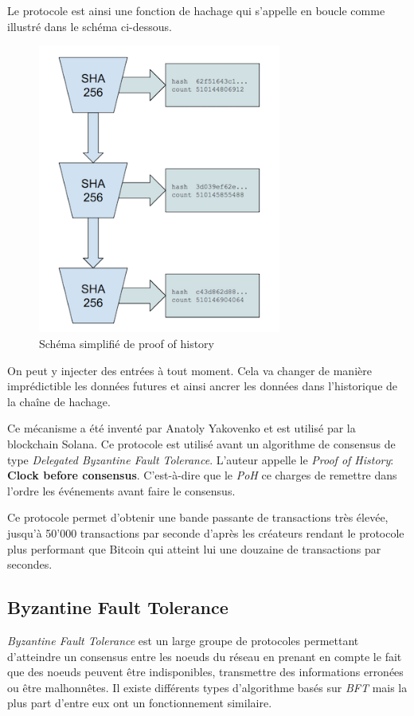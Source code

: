 Le protocole est ainsi une fonction de hachage qui s'appelle en boucle comme illustré dans le schéma ci-dessous.

\begin{figure}[H]
    \centering
    \includegraphics[width=8cm]{images/solana}
    \caption{Schéma simplifié de proof of history}
\end{figure}

On peut y injecter des entrées à tout moment. Cela va changer de manière imprédictible les données futures et ainsi ancrer les données dans l'historique de la chaîne de hachage.

Ce mécanisme a été inventé par Anatoly Yakovenko et est utilisé par la blockchain Solana. Ce protocole est utilisé avant un algorithme de consensus de type \emph{Delegated Byzantine Fault Tolerance}. L'auteur appelle le \emph{Proof of History}: \textbf{Clock before consensus}. C'est-à-dire que le \emph{PoH} ce charges de remettre dans l'ordre les événements avant faire le consensus.

Ce protocole permet d'obtenir une bande passante de transactions très élevée, jusqu'à 50'000 transactions par seconde d'après les créateurs rendant le protocole plus performant que Bitcoin qui atteint lui une douzaine de transactions par secondes.

\subsection{Byzantine Fault Tolerance}

\textit{Byzantine Fault Tolerance} est un large groupe de protocoles permettant d'atteindre un consensus entre les noeuds du réseau en prenant en compte le fait que des noeuds peuvent être indisponibles, transmettre des informations erronées ou être malhonnêtes. Il existe différents types d'algorithme basés sur \textit{BFT} mais la plus part d'entre eux ont un fonctionnement similaire. 

